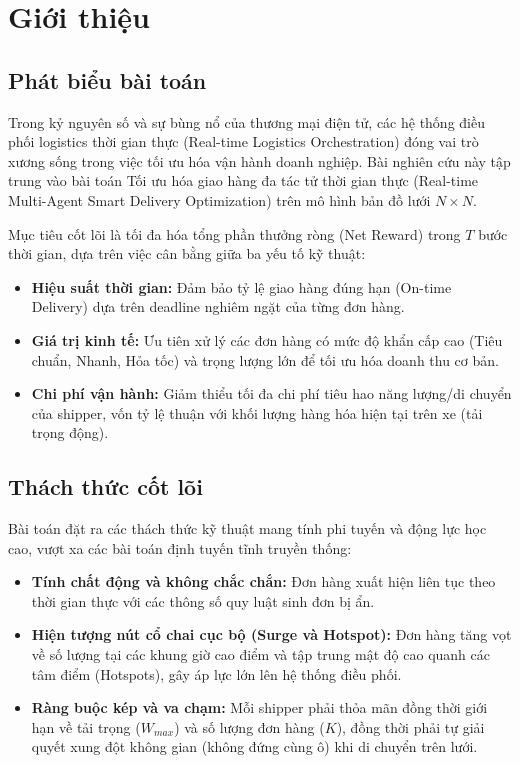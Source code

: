 \documentclass[conference]{IEEEtran}
\begin{document}
\section{Giới thiệu}
\subsection{Phát biểu bài toán}
Trong kỷ nguyên số và sự bùng nổ của thương mại điện tử, các hệ thống điều phối logistics thời gian thực (Real-time Logistics Orchestration) đóng vai trò xương sống trong việc tối ưu hóa vận hành doanh nghiệp. Bài nghiên cứu này tập trung vào bài toán Tối ưu hóa giao hàng đa tác tử thời gian thực (Real-time Multi-Agent Smart Delivery Optimization) trên mô hình bản đồ lưới $N \times N$.

Mục tiêu cốt lõi là tối đa hóa tổng phần thưởng ròng (Net Reward) trong $T$ bước thời gian, dựa trên việc cân bằng giữa ba yếu tố kỹ thuật:

\begin{itemize}
    \item \textbf{Hiệu suất thời gian:} Đảm bảo tỷ lệ giao hàng đúng hạn (On-time Delivery) dựa trên deadline nghiêm ngặt của từng đơn hàng.

    \item \textbf{Giá trị kinh tế:} Ưu tiên xử lý các đơn hàng có mức độ khẩn cấp cao (Tiêu chuẩn, Nhanh, Hỏa tốc) và trọng lượng lớn để tối ưu hóa doanh thu cơ bản.

    \item \textbf{Chi phí vận hành:} Giảm thiểu tối đa chi phí tiêu hao năng lượng/di chuyển của shipper, vốn tỷ lệ thuận với khối lượng hàng hóa hiện tại trên xe (tải trọng động).
\end{itemize}

\subsection{Thách thức cốt lõi}
Bài toán đặt ra các thách thức kỹ thuật mang tính phi tuyến và động lực học cao, vượt xa các bài toán định tuyến tĩnh truyền thống:

\begin{itemize}
    \item \textbf{Tính chất động và không chắc chắn:} Đơn hàng xuất hiện liên tục theo thời gian thực với các thông số quy luật sinh đơn bị ẩn.

    \item \textbf{Hiện tượng nút cổ chai cục bộ (Surge và Hotspot):} Đơn hàng tăng vọt về số lượng tại các khung giờ cao điểm và tập trung mật độ cao quanh các tâm điểm (Hotspots), gây áp lực lớn lên hệ thống điều phối.

    \item \textbf{Ràng buộc kép và va chạm:} Mỗi shipper phải thỏa mãn đồng thời giới hạn về tải trọng ($W_{max}$) và số lượng đơn hàng ($K$), đồng thời phải tự giải quyết xung đột không gian (không đứng cùng ô) khi di chuyển trên lưới.
\end{itemize}
\end{document}
